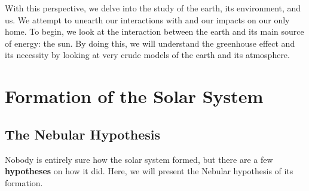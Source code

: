     With this perspective, we delve into the study of the earth, its environment, and us. We attempt to unearth our interactions with and our impacts on our only home. To begin, we look at the interaction between the earth and its main source of energy: the sun. By doing this, we will understand the greenhouse effect and its necessity by looking at very crude models of the earth and its atmosphere. 


    \section{\label{sec:solar_sys}Formation of the Solar System}
		
		\subsection{The Nebular Hypothesis}

    Nobody is entirely sure how the solar system formed, but there are a few \textbf{hypotheses} on how it did. Here, we will present the Nebular hypothesis of its formation.



